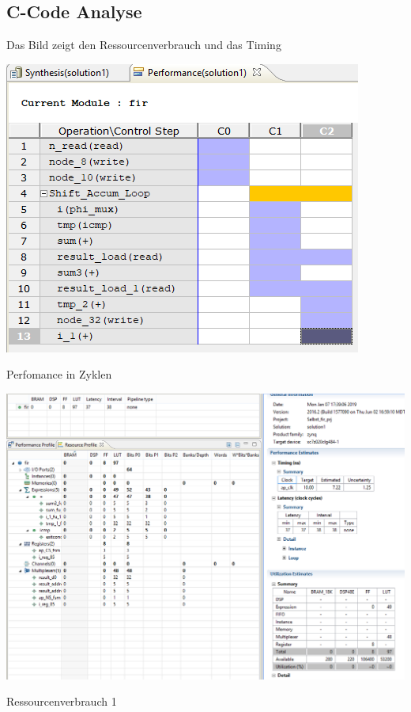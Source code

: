 \subsection{C-Code Analyse}
Das Bild zeigt den Ressourcenverbrauch und das Timing\\

\begin{minipage}{\textwidth}
    \begin{center}        
        \includegraphics[scale=0.75]{img/Fibo.png} 
    \end{center}
\end{minipage}
\begin{center}
Perfomance in Zyklen
\end{center}

\begin{minipage}{\textwidth}
    \begin{center}        
        \includegraphics[scale=0.6]{img/fibo1.png} 
    \end{center}
\end{minipage}
\begin{center}
Ressourcenverbrauch 1
\end{center}

